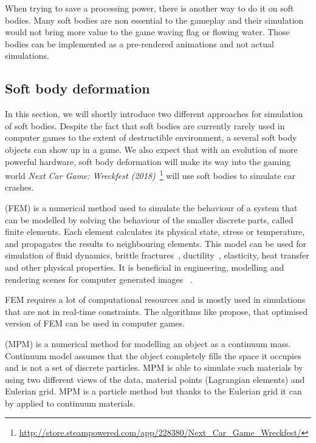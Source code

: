 When trying to save a processing power, there is another way to do it on soft bodies. Many soft bodies are non essential to the gameplay and their simulation would not bring more value to the game \eg waving flag or flowing water. Those bodies can be implemented as a pre-rendered animations and not actual simulations.

\subsection{Soft body deformation}
In this section, we will shortly introduce two different approaches for simulation of soft bodies. Despite the fact that soft bodies are currently rarely used in computer games to the extent of destructible environment, a several soft body objects can show up in a game. We also expect that with an evolution of more powerful hardware, soft body deformation will make its way into the gaming world \eg \emph{Next Car Game: Wreckfest (2018)}~\footnote{\url{http://store.steampowered.com/app/228380/Next\_Car\_Game\_Wreckfest/}} will use soft bodies to simulate car crashes.
\label{sec:softBody}

 (FEM) is a numerical method used to simulate the behaviour of a system that can be modelled by solving the behaviour of the smaller discrete parts, called finite elements. Each element calculates its physical state, \eg stress or temperature, and propagates the results to neighbouring elements. This model can be used for simulation of fluid dynamics, brittle fractures~\cite{brittlefracture}, ductility~\cite{ductilefracture}, elasticity, heat transfer and other physical properties. It is beneficial in engineering, modelling and rendering scenes for computer generated images ~\cite{Bargteil:2007:AFE}. 

FEM requires a lot of computational resources and is mostly used in simulations that are not in real-time constraints. The algorithms like \citet{femingames} propose, that optimised version of FEM can be used in computer games.


 (MPM) is a numerical method for modelling an object as a continuum mass. Continuum model assumes that the object completely fills the space it occupies and is not a set of discrete particles. MPM is able to simulate such materials by using two different views of the data, material points (Lagrangian elements) and Eulerian grid. MPM is a particle method but thanks to the Eulerian grid it can by applied to continuum materials. 

